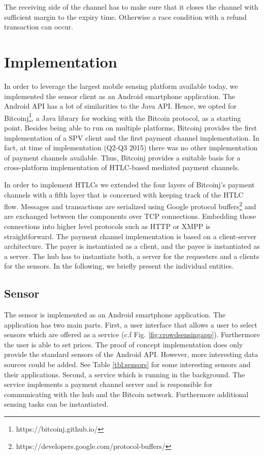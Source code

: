  The receiving side of the channel has to make sure that it closes the channel with sufficient margin to the expiry time. Otherwise a race condition with a refund transaction can occur.

\section{Implementation}
\label{sec:trustlessimplementation}

In order to leverage the largest mobile sensing platform available today, we implemented the sensor client as an Android smartphone application. The Android \ac{API} has a lot of similarities to the Java \ac{API}. Hence, we opted for Bitcoinj\footnote{https://bitcoinj.github.io/}, a Java library for working with the Bitcoin protocol,  as a starting point. Besides being able to run on multiple platforms, Bitcoinj provides the first implementation of a \ac{SPV} client and the first payment channel implementation. In fact, at time of implementation (Q2-Q3 2015) there was no other implementation of payment channels available. Thus, Bitcoinj provides a suitable basis for a cross-platform implementation of \ac{HTLC}-based mediated payment channels.

In order to implement \ac{HTLC}s we extended the four layers of Bitcoinj's payment channels with a fifth layer that is concerned with keeping track of the \ac{HTLC} flow.
Messages and transactions are serialized using Google protocol buffers\footnote{https://developers.google.com/protocol-buffers/} and are exchanged between the components over \ac{TCP} connections. Embedding those connections into higher level protocols such as \ac{HTTP} or \ac{XMPP} is straightforward.
The payment channel implementation is based on a client-server architecture. The payer is instantiated as a client, and the payee is instantiated as a server. The hub has to instantiate both, a server for the requesters and a clients for the sensors. In the following, we briefly present the individual entities. 

\subsection{Sensor}
The sensor is implemented as an Android smartphone application. The application has two main parts. First, a user interface that allows a user to select sensors which are offered as a service (c.f Fig. \ref{fig:crowdsensingapp}). Furthermore the user is able to set prices. The proof of concept implementation does only provide the standard sensors of the Android API. However, more interesting data sources could be added. See Table \ref{tbl:sensors} for some interesting sensors and their applications. Second, a service which is running in the background. The service implements a payment channel server and is responsible for communicating with the hub and the Bitcoin network. Furthermore additional sensing tasks can be instantiated.

